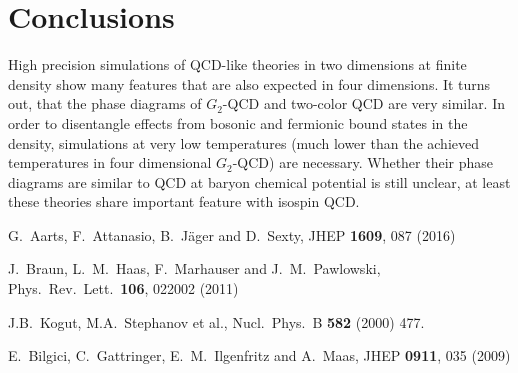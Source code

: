 \documentclass{PoS}
\begin{document}
\section{Conclusions}\label{sconclusions}
\noindent
High precision simulations of QCD-like theories in two dimensions at finite density show many features that are also expected in four dimensions.
It turns out, that the phase diagrams of $G_2$-QCD and two-color QCD are very similar. In order to disentangle effects from bosonic and fermionic bound states in the density, simulations at very low temperatures 
(much lower than the achieved temperatures in four dimensional $G_2$-QCD) are necessary. Whether their phase diagrams are similar to QCD at baryon chemical potential is still unclear, at least these theories share important feature with
isospin QCD.


\begin{thebibliography}{99}

\providecommand{\eprint}[1]{ [\href{http://arxiv.org/abs/#1}{arXiv:#1}]}

  G.~Aarts, F.~Attanasio, B.~Jäger and D.~Sexty,
  JHEP {\bf 1609}, 087 (2016)
  
  J.~Braun, L.~M.~Haas, F.~Marhauser and J.~M.~Pawlowski,
  Phys.\ Rev.\ Lett.\  {\bf 106}, 022002 (2011)
  
  J.B.~Kogut, M.A.~Stephanov et al.,
 \newblock Nucl.\ Phys.\ B {\bf 582} (2000) 477.
  
  E.~Bilgici, C.~Gattringer, E.~M.~Ilgenfritz and A.~Maas,
  JHEP {\bf 0911}, 035 (2009)
  

\end{thebibliography}
\end{document}
